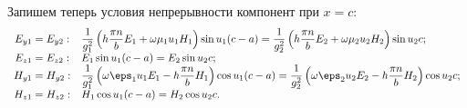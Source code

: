 Запишем теперь условия непрерывности компонент при \( x = c \):
\begin{equation}
\begin{array}{cl}
    E_{y1} = E_{y2}: &
    \frac{1}{g_1^2} \left(h \frac{\pi n}{b} E_1 + \omega\mu_1u_1H_1\right)
    \sin u_1 (c-a) =  \frac{1}{g_2^2}
    \left(h \frac{\pi n}{b} E_2 + \omega\mu_2u_2H_2\right)
    \sin u_2 c ;\\
    E_{z1} = E_{z2}: & E_1\sin u_1 (c-a) = E_2\sin u_2 c; \\
    H_{y1} = H_{y2}: &
    \frac{1}{g_1^2}\left(\omega\eps_1u_1E_1-h \frac{\pi n}{b} H_1\right)
    \cos u_1 (c-a) = \frac{1}{g_2^2}
    \left(\omega\eps_2u_2E_2-h \frac{\pi n}{b} H_2\right)\cos u_2 c ;\\
    H_{z1} = H_{z2}: & H_1\cos u_1 (c-a) = H_2\cos u_2 c.\\
\end{array}
    \label{eq:fast_waves_continuity}
\end{equation}


